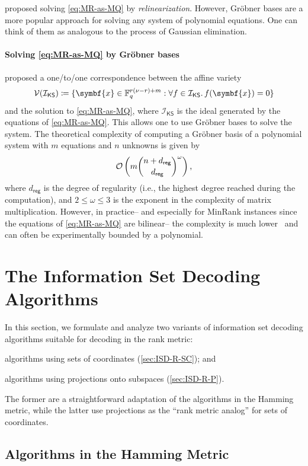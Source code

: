 \documentclass[version=last, paper=A4, parskip=half, oneside,%
toc=bibliography, toc=listof, listof=leveldown]{scrbook}
\theoremstyle{plain}
\theoremstyle{definition}
\theoremstyle{remark}
\renewcommand*{\vec}{\symbf}
\newcommand*{\FF}{\ensuremath{\mathbb{F}}}
\newcommand*{\reg}{\ensuremath{\mathsf{reg}}}
\newcommand*{\KS}{\ensuremath{\mathsf{KS}}}
\begin{document}
\Textcite{KS99} proposed solving \cref{eq:MR-as-MQ} by \emph{relinearization}.
However, Gröbner bases are a more popular approach for solving any system of
polynomial equations.  One can think of them as analogous to the process of
Gaussian elimination.

\paragraph{Solving \cref{eq:MR-as-MQ} by Gröbner bases} \Textcite{FLP08}
proposed a one\-/to\-/one correspondence between the affine variety
\[
  \mathcal{V}(\mathcal{I}_{\KS}) \coloneqq
  \{\vec{x} \in \FF_q^{r (\nu - r) + m} : \forall f \in \mathcal{I}_{\KS}\ldotp f(\vec{x}) = 0\}
\]
and the solution to \cref{eq:MR-as-MQ}, where \(\mathcal{I}_{\KS}\) is the ideal
generated by the equations of \cref{eq:MR-as-MQ}.  This allows one to use
Gröbner bases to solve the system.  The theoretical complexity of computing a
Gröbner basis of a polynomial system with \(m\) equations and \(n\) unknowns is
given by
\[
  \mathcal{O}\left(m \binom{n + d_{\reg}}{d_{\reg}}^{\omega}\right)\text,
\]
where \(d_{\reg}\) is the degree of regularity (i.e., the highest degree reached
during the computation), and \(2 \le \omega \le 3\) is the exponent in the
complexity of matrix multiplication.  However, in practice\--- and especially
for MinRank instances since the equations of \cref{eq:MR-as-MQ} are bilinear\---
the complexity is much lower~\cite{FLP08} and can often be experimentally
bounded by a polynomial.

\section{The Information Set Decoding Algorithms}

In this section, we formulate and analyze two variants of information set
decoding algorithms suitable for decoding in the rank metric:
\begin{enumerate*}[label={(\arabic*)}]
\item algorithms using sets of coordinates (\cref{sec:ISD-R-SC}); and
\item algorithms using projections onto subspaces (\cref{sec:ISD-R-P}).
\end{enumerate*}
The former are a straightforward adaptation of the algorithms in the Hamming
metric, while the latter use projections as the \enquote{rank metric analog}
for sets of coordinates.

\subsection{Algorithms in the Hamming Metric}\label{sec:ISD-H}
\end{document}
